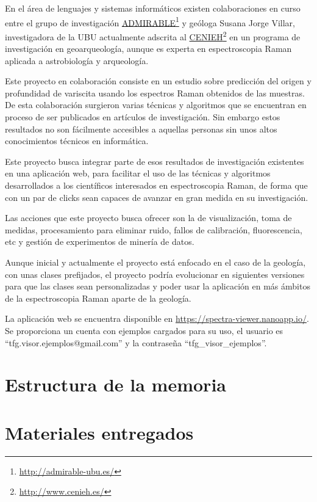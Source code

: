 En el área de lenguajes y sistemas informáticos existen colaboraciones en curso entre el grupo de investigación \href{http://admirable-ubu.es/}{ADMIRABLE}\footnote{\url{http://admirable-ubu.es/}} y geóloga Susana Jorge Villar, investigadora de la UBU actualmente adscrita al \href{http://www.cenieh.es/}{CENIEH}\footnote{\url{http://www.cenieh.es/}} en un programa de investigación en geoarqueología\cite{susana-cenieh}, aunque es experta en espectroscopia Raman aplicada a astrobiología y arqueología\cite{susana-ubu}.

Este proyecto en colaboración consiste en un estudio sobre predicción del origen y profundidad de variscita usando los espectros Raman obtenidos de las muestras. De esta colaboración surgieron varias técnicas y algoritmos que se encuentran en proceso de ser publicados en artículos de investigación. Sin embargo estos resultados no son fácilmente accesibles a aquellas personas sin unos altos conocimientos técnicos en informática.

Este proyecto busca integrar parte de esos resultados de investigación existentes en una aplicación web, para facilitar el uso de las técnicas y algoritmos desarrollados a los científicos interesados en espectroscopia Raman, de forma que con un par de clicks sean capaces de avanzar en gran medida en su investigación.

Las acciones que este proyecto busca ofrecer son la de visualización, toma de medidas, procesamiento para eliminar ruido, fallos de calibración, fluorescencia, etc y gestión de experimentos de minería de datos.

Aunque inicial y actualmente el proyecto está enfocado en el caso de la geología, con unas clases prefijados, el proyecto podría evolucionar en siguientes versiones para que las clases sean personalizadas y poder usar la aplicación en más ámbitos de la espectroscopia Raman aparte de la geología.

La aplicación web se encuentra disponible en \url{https://spectra-viewer.nanoapp.io/}. Se proporciona un cuenta con ejemplos cargados para su uso, el usuario es ``tfg.visor.ejemplos@gmail.com'' y la contraseña ``tfg\_visor\_ejemplos''.

\section{Estructura de la memoria}

\section{Materiales entregados}
